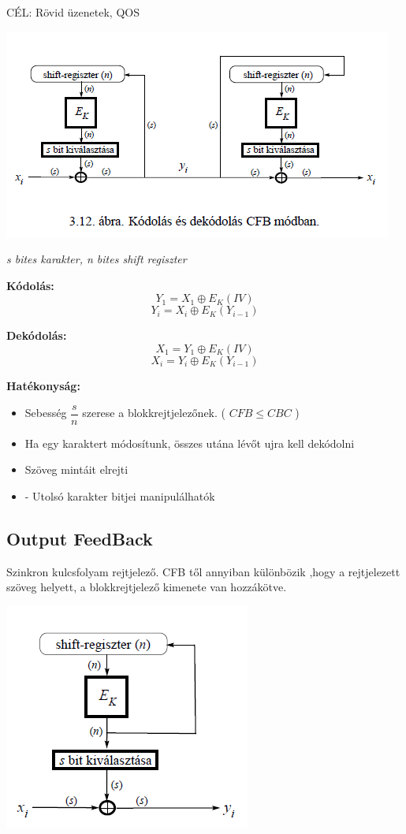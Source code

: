CÉL: Rövid üzenetek, QOS


	\begin{center}
		\includegraphics[scale=0.8]{img/CFB}

		\textit{s bites karakter, n bites shift regiszter}
	\end{center}


\textbf{Kódolás:}
	$$Y_1 = X_1 \oplus E_K(IV) $$
	$$Y_i = X_i \oplus E_K(Y_{i-1}) $$

\textbf{Dekódolás:}
	$$X_1 = Y_1 \oplus E_K(IV) $$
	$$X_i = Y_i \oplus E_K(Y_{i-1})$$

\textbf{Hatékonyság:}
	\begin{itemize}
		\item Sebesség $\dfrac{s}{n}$ szerese a blokkrejtjelezőnek. ( $CFB \leq CBC $ )
		\item Ha egy karaktert módosítunk, összes utána lévőt ujra kell dekódolni
		\item Szöveg mintáit elrejti
		\item - Utolsó karakter bitjei manipulálhatók
	\end{itemize}


\subsection{Output FeedBack}

Szinkron kulcsfolyam rejtjelező. CFB től annyiban különbözik ,hogy a rejtjelezett szöveg helyett, a blokkrejtjelező kimenete van hozzákötve.

\begin{center}
	\includegraphics[scale=0.7]{img/OFB}
\end{center}


